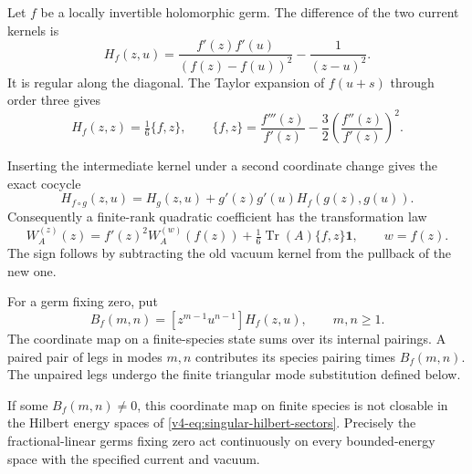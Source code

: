 Let \(f\) be a locally invertible holomorphic germ.
The difference of the two current kernels is
\begin{equation}\label{v4-eq:singular-coordinate-kernel}
 H_f(z,u)=\frac{f'(z)f'(u)}{(f(z)-f(u))^2}
                         -\frac1{(z-u)^2}.
\end{equation}
It is regular along the diagonal. The Taylor
expansion of \(f(u+s)\) through order three gives
\begin{equation}\label{v4-eq:singular-Schwarzian}
 H_f(z,z)=\tfrac16\{f,z\},\qquad
 \{f,z\}=\frac{f'''(z)}{f'(z)}
              -\frac32\left(\frac{f''(z)}{f'(z)}\right)^2.
\end{equation}

Inserting the intermediate kernel under a second
coordinate change gives the exact cocycle
\begin{equation}\label{v4-eq:singular-kernel-cocycle}
 H_{f\circ g}(z,u)
       =H_g(z,u)+g'(z)g'(u)H_f(g(z),g(u)).
\end{equation}
Consequently a finite-rank quadratic coefficient
has the transformation law
\begin{equation}\label{v4-eq:singular-coordinate-quadratic}
 W_A^{(z)}(z)
   =f'(z)^2W_A^{(w)}(f(z))
          +\tfrac16\operatorname{Tr}(A)\{f,z\}\mathbf1,
 \qquad w=f(z).
\end{equation}
The sign follows by subtracting the old vacuum
kernel from the pullback of the new one.

For a germ fixing zero, put
\[
 B_f(m,n)=[z^{m-1}u^{n-1}]H_f(z,u),\qquad m,n\geq1.
\]
The coordinate map on a finite-species state sums
over its internal pairings. A paired pair of
legs in modes \(m,n\) contributes its species
pairing times \(B_f(m,n)\). The unpaired legs
undergo the finite triangular mode substitution
defined below.

\begin{theorem}\label{v4-thm:singular-coordinate-obstruction}
If some \(B_f(m,n)\ne0\), this coordinate map
on finite species is not closable in the
Hilbert energy spaces of
\eqref{v4-eq:singular-hilbert-sectors}.
Precisely the fractional-linear germs fixing
zero act continuously on every bounded-energy
space with the specified current and vacuum.
\end{theorem}

